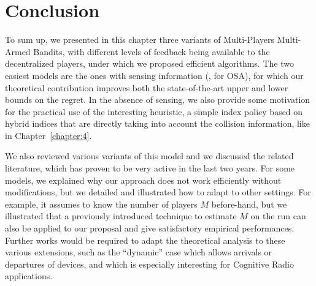 




\section{Conclusion}
\label{sec:5:conclusion}

To sum up, we presented in this chapter three variants of Multi-Players Multi-Armed Bandits,
with different levels of feedback being available to the decentralized players, under which we proposed efficient algorithms.
The two easiest models are the ones with sensing information (\ie, for OSA), for which our theoretical contribution improves both the state-of-the-art upper and lower bounds on the regret. In the absence of sensing, we also provide some motivation for the practical use of the interesting \Selfish{} heuristic, a simple index policy based on hybrid indices that are directly taking into account the collision information, like in Chapter~\ref{chapter:4}.

We also reviewed various variants of this model and we discussed the related literature, which has proven to be very active in the last two years. For some models, we explained why our approach does not work efficiently without modifications, but we detailed and illustrated how to adapt \MCTopM{} to other settings.
For example, it assumes to know the number of players $M$ before-hand, but we illustrated that a previously introduced technique to estimate $M$ on the run can also be applied to our proposal and give satisfactory empirical performances.
Further works would be required to adapt the theoretical analysis to these various extensions, such as the ``dynamic'' case which allows arrivals or departures of devices, and which is especially interesting for Cognitive Radio applications.

